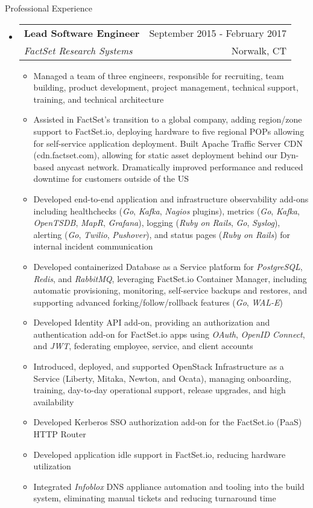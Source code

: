 \documentclass[letterpaper,10pt]{article}
\makeatletter
\newenvironment{ressection}[1]{
	\vspace{4pt}
	{\fontfamily{phv}\selectfont\Large#1}
	\begin{itemize}
	\vspace{3pt}
}{
	\end{itemize}
}
\newcommand{\ressubitem}[1]{
	\vspace{-1pt}
	\item \begin{flushleft} #1 \end{flushleft}
}
\newcommand{\resbigitem}[4]{
	\vspace{-5pt}
	\item
	\begin{tabular*}{6in}{l@{\extracolsep{\fill}}r}
		\textbf{#1} & #2 \\
		\textit{#3} & #4\\
	\end{tabular*}
}
\newenvironment{ressubsec}[4]{
	\resbigitem{#1}{#2}{#3}{#4}
	\vspace{-2pt}
	\begin{itemize}
}{
	\end{itemize}
}
\makeatother
\begin{document}
\begin{ressection}{Professional Experience}
	\begin{ressubsec}{Lead Software Engineer}{September 2015 - February 2017}{FactSet Research Systems}{Norwalk, CT}
		\ressubitem{Managed a team of three engineers, responsible for recruiting, team building, product development, project management, technical support, training, and technical architecture}
		\ressubitem{Assisted in FactSet's transition to a global company, adding region/zone support to FactSet.io, deploying hardware to five regional POPs allowing for self-service application deployment.  Built Apache Traffic Server CDN (cdn.factset.com), allowing for static asset deployment behind our Dyn-based anycast network.  Dramatically improved performance and reduced downtime for customers outside of the US}
		\ressubitem{Developed end-to-end application and infrastructure observability add-ons including healthchecks (\textit{Go}, \textit{Kafka}, \textit{Nagios} plugins), metrics (\textit{Go}, \textit{Kafka}, \textit{OpenTSDB}, \textit{MapR}, \textit{Grafana}), logging (\textit{Ruby on Rails}, \textit{Go}, \textit{Syslog}), alerting (\textit{Go}, \textit{Twilio}, \textit{Pushover}), and status pages (\textit{Ruby on Rails}) for internal incident communication}
		\ressubitem{Developed containerized Database as a Service platform for \textit{PostgreSQL}, \textit{Redis}, and \textit{RabbitMQ}, leveraging FactSet.io Container Manager, including automatic provisioning, monitoring, self-service backups and restores, and supporting advanced forking/follow/rollback features (\textit{Go}, \textit{WAL-E})}
		\ressubitem{Developed Identity API add-on, providing an authorization and authentication add-on for FactSet.io apps using \textit{OAuth}, \textit{OpenID Connect}, and \textit{JWT}, federating employee, service, and client accounts}
		\ressubitem{Introduced, deployed, and supported OpenStack Infrastructure as a Service (Liberty, Mitaka, Newton, and Ocata), managing onboarding, training, day-to-day operational support, release upgrades, and high availability}
		\ressubitem{Developed Kerberos SSO authorization add-on for the FactSet.io (PaaS) HTTP Router}
		\ressubitem{Developed application idle support in FactSet.io, reducing hardware utilization}
		\ressubitem{Integrated \textit{Infoblox} DNS appliance automation and tooling into the build system, eliminating manual tickets and reducing turnaround time}
	\end{ressubsec}

	\pagebreak


\end{ressection}
\end{document}
